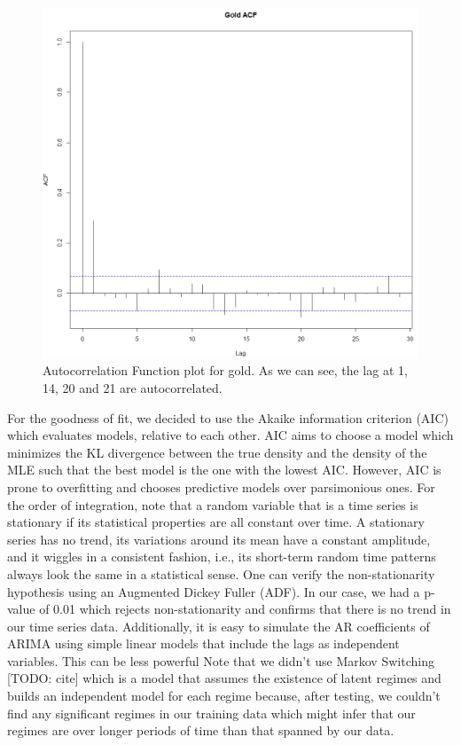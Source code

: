 \begin{figure}[ht]
	\vskip 0.2in
	\begin{center}
		\centerline{\includegraphics[width=\columnwidth]{ACF.png}}
		\caption{Autocorrelation Function plot for gold. As we can see, the lag at 1, 14, 20 and 21 are autocorrelated.}
	\end{center}
	\vskip -0.2in
	\label{fig:ACF}
\end{figure}
For the goodness of fit, we decided to use the Akaike information criterion (AIC) which evaluates models, relative to each other. AIC aims to choose a model which minimizes the KL divergence between the true density and the density of the MLE such that the best model is the one with the lowest AIC. However, AIC is prone to overfitting and chooses predictive models over parsimonious ones.
For the order of integration, note that a random variable that is a time series is stationary if its statistical properties are all constant over time.  A stationary series has no trend, its variations around its mean have a constant amplitude, and it wiggles in a consistent fashion, i.e., its short-term random time patterns always look the same in a statistical sense. \cite{tsay, VAR}
One can verify the non-stationarity hypothesis using an Augmented Dickey Fuller (ADF). In our case, we had a p-value of 0.01 which rejects non-stationarity and confirms that there is no trend in our time series data.
Additionally, it is easy to simulate the AR coefficients of ARIMA using simple linear models that include the lags as independent variables. This can be less powerful
Note that we didn't use Markov Switching [TODO: cite] which is a model that assumes the existence of latent regimes and builds an independent model for each regime because, after testing, we couldn't find any significant regimes in our training data which might infer that our regimes are over longer periods of time than that spanned by our data.
